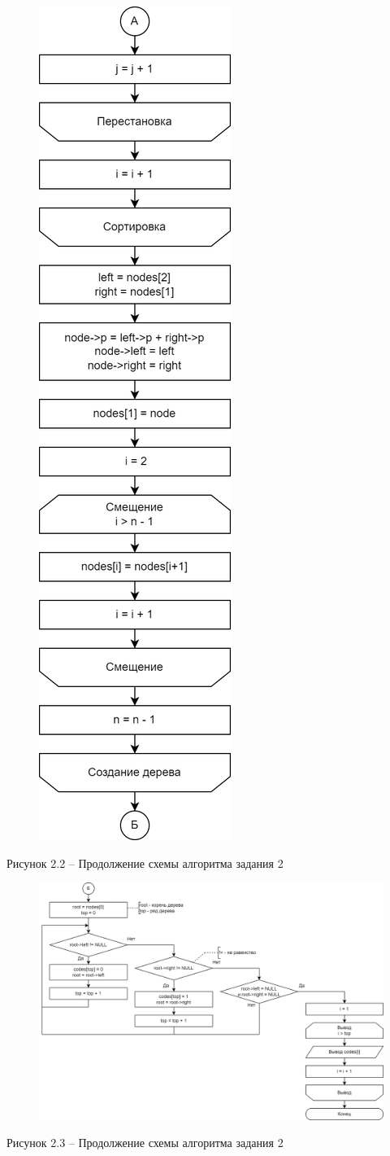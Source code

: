 \documentclass[a4paper,14pt]{extarticle}
\begin{document}
  \begin{figure}[h]
    \centering
    \includegraphics[width=0.27\linewidth]{schemes/s-2-2}
  \end{figure}
  \begin{center}
    Рисунок 2.2 – Продолжение схемы алгоритма задания 2
  \end{center}
  \pagebreak

  \begin{figure}[h]
    \centering
    \includegraphics[width=1\linewidth]{schemes/s-2-3}
  \end{figure}
  \begin{center}
    Рисунок 2.3 – Продолжение схемы алгоритма задания 2
  \end{center}
\end{document}
